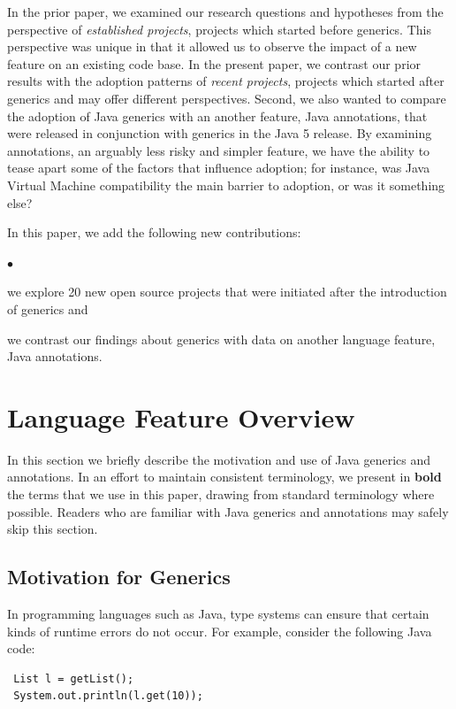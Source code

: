 \documentclass{svjour3}
\newcommand{\squishlist}{
   \begin{list}{$\bullet$}
    { \setlength{\itemsep}{0pt}      \setlength{\parsep}{3pt}
      \setlength{\topsep}{3pt}       \setlength{\partopsep}{0pt}
      \setlength{\leftmargin}{1.5em} \setlength{\labelwidth}{1em}
      \setlength{\labelsep}{0.5em} } }
\newcommand{\squishend}{
    \end{list}  }
\begin{document}
In the prior paper, we examined our research questions and hypotheses from the perspective of \emph{established projects}, projects which started before generics.
This perspective was unique in that it allowed us to observe the impact of a new feature on an existing code base.
In the present paper, we contrast our prior results with the adoption patterns of \emph{recent projects}, projects which started after generics and may offer different perspectives.
Second, we also wanted to compare the adoption of Java generics with an another feature, Java annotations, that were released in conjunction with generics in the Java 5 release.
By examining annotations, an arguably less risky and simpler feature, we have the ability to tease apart some of the factors that influence adoption;
for instance, was Java Virtual Machine compatibility the main barrier to adoption, or was it something else?

In this paper, we add the following new contributions:
\squishlist
  \item we explore 20 new open source projects that were initiated
  		after the introduction of generics and
  \item	we contrast our findings about generics with data on another
  		language feature, Java annotations.
\squishend


\section{Language Feature Overview}

\noindent
In this section
we briefly describe the motivation and use of Java generics and annotations.
In an effort to maintain consistent terminology, 
we present in \textbf{bold} the terms 
that we use in this paper, drawing from standard terminology 
where possible.
Readers who are familiar with Java generics and annotations may safely
skip this section.

\subsection{Motivation for Generics}\label{sec:lifeWithoutGenerics}

\noindent
In programming languages such as Java, type systems can ensure that certain
kinds of runtime errors do not occur.
For example, consider the following Java code:


\begin{lstlisting}
 List l = getList();
 System.out.println(l.get(10));
\end{lstlisting}
\end{document}
